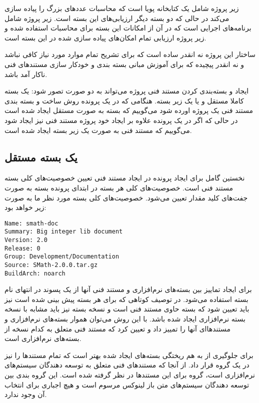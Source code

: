 زیر پروژه  شامل یک کتابخانه پویا است که
محاسبات عددهای بزرگ را پیاده سازی می‌کند در حالی که دو بسته دیگر ارزیابی‌های این
بسته است. زیر پروژه  شامل برنامه‌های اجرایی است که در آن از
امکانات این بسته برای محاسبات استفاده شده و زیر پروژه 
ارزیابی تمام امکان‌های پیاده سازی شده در این بسته است.

ساختار این پروژه نه انقدر ساده است که برای تشریح تمام موارد مورد نیاز کافی نباشد
و نه انقدر پیچیده که برای آموزش مبانی بسته بندی و خودکار سازی مستند‌های فنی
ناکار آمد باشد.

ایجاد و بسته‌بندی کردن مستند فنی پروژه می‌تواند به دو صورت تصور شود: یک بسته
کاملا مستقل و یا یک زیر بسته. هنگامی که در یک پرونده  روش ساخت و بسته
بندی مستند فنی یک پروژه اورده شود می‌گوییم که بسته به صورت مستقل ایجاد شده است
در حالی که اگر در یک پرونده  علاوه بر ایجاد خود پروژه مستند فنی نیز
ایجاد شود می‌گوییم که مستند فنی به صورت یک زیر بسته ایجاد شده است.

\subsection{یک بسته مستقل}

نخستین گامل برای ایجاد پرونده  در ایجاد مستند فنی تعیین خصوصیت‌های کلی
بسته مستند فنی است. خصوصیت‌های کلی هر بسته در ابتدای پرونده بسته به صورت جفت‌های
کلید مقدار تعیین می‌شود.  خصوصیت‌های کلی بسته مورد نظر ما به صورت زیر خواهد بود:

\begin{latin}
\lstset{language=TeX}  
\begin{lstlisting}[frame=single] 
Name: smath-doc
Summary: Big integer lib document
Version: 2.0
Release: 0
Group: Development/Documentation
Source: SMath-2.0.0.tar.gz
BuildArch: noarch
\end{lstlisting}
\end{latin}

برای ایجاد تماییز بین بسته‌های نرم‌افزاری و مستند فنی آنها از یک پسوند 
در انتهای نام بسته استفاده می‌شود. در توصیف کوتاهی که برای هر بسته پیش بینی شده
است نیز باید تعیین شود که بسته حاوی مستند فنی است و نسخه بسته نیز باید مشابه با
نسخه بسته نرم‌افزاری ایجاد شده باشد. با این روش می‌توان هموار بسته‌های
نرم‌افزاری و مستندهاای آنها را تمییز داد و تعیین کرد که مستند فنی متعلق به کدام
نسخه از بسته‌های نرم‌افزاری است.

برای جلوگیری از به هم ریختگی بسته‌های ایجاد شده بهتر است که تمام مستندها را نیز
در یک گروه قرار داد. از آنجا که مستند‌های فنی متعلق به توسعه دهندگان سیستم‌های
نرم‌افزاری است، گروه  برای این مستندها در نظر
گرفته شده است. این گروه بندی بین توسعه دهندگان سیستم‌های متن باز لینوکس مرسوم
است و هیچ اجباری برای انتخاب آن وجود ندارد.

